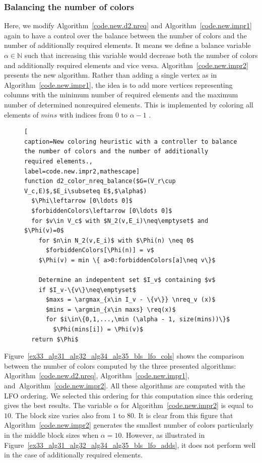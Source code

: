 \documentclass[12pt, twoside,a4paper,toc=bibliography]{scrbook}
\DeclareMathOperator*{\argmin}{arg\,min}
\DeclareMathOperator*{\argmax}{arg\,max}
\newcommand{\figref}[1]{Figure~\protect\ref{#1}}
\newcommand{\coderef}[1]{Algorithm~\protect\ref{#1}}
\newcommand{\nreq}{L}
\newcommand{\req}{M}
\begin{document}
\subsubsection{Balancing the number of colors}
Here, we modify \coderef{code.new.d2.nreq} and \coderef{code.new.impr1} again 
to have a control over the balance between the number of 
colors and the number of additionally required elements.
It means we define a balance variable $\alpha \in \mathbb{N}$ such that increasing this variable 
would decrease both the number of colors and additionally required elements and vice versa.
\coderef{code.new.impr2} presents the new algorithm.
Rather than adding a single vertex as in \coderef{code.new.impr1},
the idea is to add more vertices representing columns
with the minimum number of required elements
and the maximum number of determined nonrequired elements.
This is implemented by coloring all elements of $mins$ with indices from $0$ to $\alpha-1$ .
\begin{figure}
\begin{lstlisting}[
caption=New coloring heuristic with a controller to balance
the number of colors and the number of additionally required elements.,
label=code.new.impr2,mathescape]
function d2_color_nreq_balance($G=(V_r\cup V_c,E)$,$E_i\subseteq E$,$\alpha$)
  $\Phi\leftarrow [0\ldots 0]$
  $forbiddenColors\leftarrow [0\ldots 0]$
  for $v\in V_c$ with $N_2(v,E_i)\neq\emptyset$ and $\Phi(v)=0$
    for $n\in N_2(v,E_i)$ with $\Phi(n) \neq 0$
      $forbiddenColors[\Phi(n)] = v$
    $\Phi(v) = min \{ a>0:forbiddenColors[a]\neq v\}$

    Determine an indepentent set $I_v$ containing $v$
    if $I_v-\{v\}\neq\emptyset$
      $maxs = \argmax_{x\in I_v - \{v\}} \nreq_v (x)$
      $mins = \argmin_{x\in maxs} \req(x)$ 
      for $i\in\{0,1,...,\min (\alpha - 1, size(mins))\}$
        $\Phi(mins[i]) = \Phi(v)$
  return $\Phi$
\end{lstlisting}
\end{figure}

\figref{ex33_alg31_alg32_alg34_alg35_bls_lfo_cols}
shows the comparison between the number of colors computed by 
the three presented algorithms: \coderef{code.new.d2.nreq},
\coderef{code.new.impr1}, and~\coderef{code.new.impr2}.
All these algorithms are computed with the LFO ordering.
We selected this ordering for this computation 
since this ordering gives the best results.
The variable $\alpha$ for \coderef{code.new.impr2} is equal to $10$.
The block size varies also from $1$ to $80$.
It is clear from this figure that \coderef{code.new.impr2} generates the 
smallest number of colors particularly in the middle block sizes when $\alpha=10$.
However, as illustrated in \figref{ex33_alg31_alg32_alg34_alg35_bls_lfo_adds}, 
it does not perform well in the case of additionally required elements.
\end{document}
